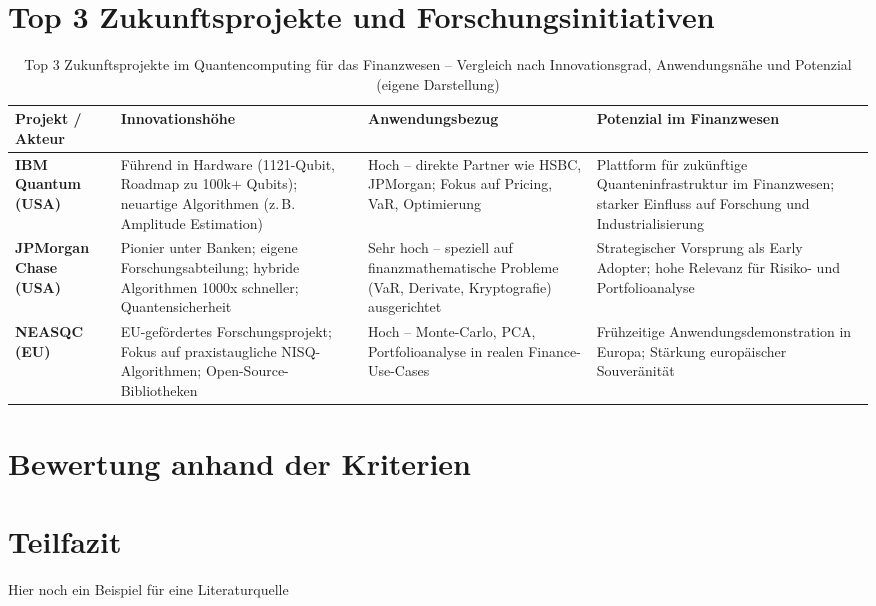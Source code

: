 \section{Top 3 Zukunftsprojekte und Forschungsinitiativen}

\vspace{0.5em}
\begin{table}[h]
\centering
\renewcommand{\arraystretch}{1.3}
\begin{tabular}{|p{3.5cm}|p{3.5cm}|p{3cm}|p{4.5cm}|}
\hline
\textbf{Projekt / Akteur} & \textbf{Innovationshöhe} & \textbf{Anwendungsbezug} & \textbf{Potenzial im Finanzwesen} \\
\hline
\textbf{IBM Quantum (USA)} & Führend in Hardware (1121-Qubit, Roadmap zu 100k+ Qubits); neuartige Algorithmen (z.\,B. Amplitude Estimation) & Hoch – direkte Partner wie HSBC, JPMorgan; Fokus auf Pricing, VaR, Optimierung & Plattform für zukünftige Quanteninfrastruktur im Finanzwesen; starker Einfluss auf Forschung und Industrialisierung \\
\hline
\textbf{JPMorgan Chase (USA)} & Pionier unter Banken; eigene Forschungsabteilung; hybride Algorithmen 1000x schneller; Quantensicherheit & Sehr hoch – speziell auf finanzmathematische Probleme (VaR, Derivate, Kryptografie) ausgerichtet & Strategischer Vorsprung als Early Adopter; hohe Relevanz für Risiko- und Portfolioanalyse \\
\hline
\textbf{NEASQC (EU)} & EU-gefördertes Forschungsprojekt; Fokus auf praxistaugliche NISQ-Algorithmen; Open-Source-Bibliotheken & Hoch – Monte-Carlo, PCA, Portfolioanalyse in realen Finance-Use-Cases & Frühzeitige Anwendungsdemonstration in Europa; Stärkung europäischer Souveränität \\
\hline
\end{tabular}
\caption{Top 3 Zukunftsprojekte im Quantencomputing für das Finanzwesen – Vergleich nach Innovationsgrad, Anwendungsnähe und Potenzial (eigene Darstellung)}
\end{table}


\section{Bewertung anhand der Kriterien}

\section{Teilfazit}

Hier noch ein Beispiel für eine Literaturquelle 


\cite{feri_cognitive_finance_institute_quantenzeitalter_2024}

\printbibliography



